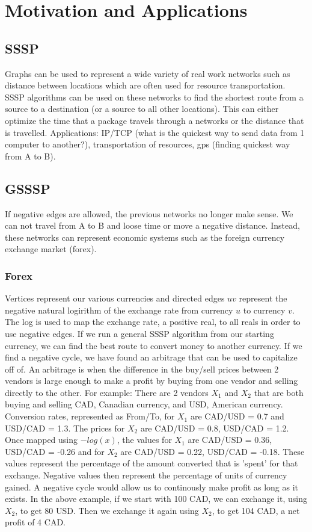 \documentclass{article}
\begin{document}
\section{Motivation and Applications}
\subsection{SSSP}
Graphs can be used to represent a wide variety of real work networks such as distance between locations which are often used for resource transportation. SSSP algorithms can be used on these networks to find the shortest route from a source to a destination (or a source to all other locations). This can either optimize the time that a package travels through a networks or the distance that is travelled. Applications: IP/TCP (what is the quickest way to send data from 1 computer to another?), transportation of resources, gps (finding quickest way from A to B). 

\subsection{GSSSP}
If negative edges are allowed, the previous networks no longer make sense. We can not travel from A to B and loose time or move a negative distance. Instead, these networks can represent economic systems such as the foreign currency exchange market (forex). 

\subsubsection{Forex}
Vertices represent our various currencies and directed edges $uv$ represent the negative natural logirithm of the exchange rate from currency $u$ to currency $v$. The log is used to map the exchange rate, a positive real, to all reals in order to use negative edges. If we run a general SSSP algorithm from our starting currency, we can find the best route to convert money to another currency. If we find a negative cycle, we have found an arbitrage that can be used to capitalize off of. An arbitrage is when the difference in the buy/sell prices between 2 vendors is large enough to make a profit by buying from one vendor and selling directly to the other. 
For example: There are 2 vendors $X_1$ and $X_2$ that are both buying and selling CAD, Canadian currency, and USD, American currency. Conversion rates, represented as From/To, for $X_1$ are CAD/USD = 0.7 and USD/CAD = 1.3. The prices for $X_2$ are CAD/USD = 0.8, USD/CAD = 1.2. Once mapped using $-log(x)$, the values for $X_1$ are CAD/USD = 0.36, USD/CAD = -0.26 and for $X_2$ are CAD/USD = 0.22, USD/CAD = -0.18. These values represent the percentage of the amount converted that is 'spent' for that exchange. Negative values then represent the percentage of units of currency gained. A negative cycle would allow us to continously make profit as long as it exists. In the above example, if we start with 100 CAD, we can exchange it, using $X_2$, to get 80 USD. Then we exchange it again using $X_2$, to get 104 CAD, a net profit of 4 CAD.
\end{document}
